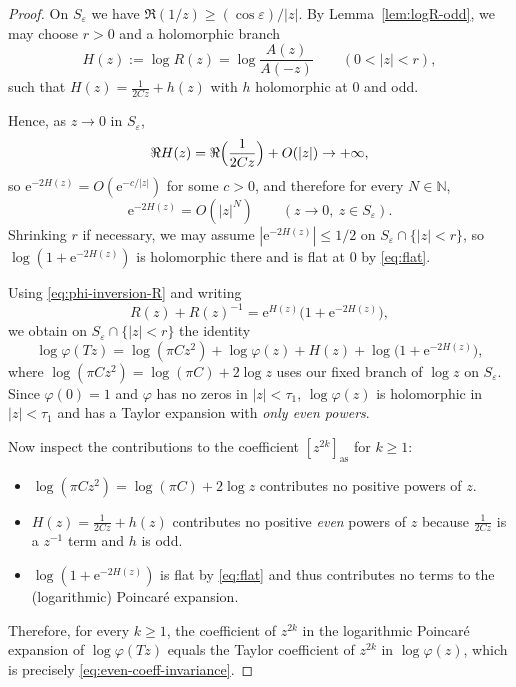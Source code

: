 \documentclass[11pt,letterpaper]{amsart}
\numberwithin{equation}{section}
\theoremstyle{definition}
\newcommand{\N}{\mathbb{N}}
\newcommand{\e}{\mathrm{e}}
\begin{document}
\begin{proof}
On $S_\varepsilon$ we have $\Re(1/z)\ge (\cos\varepsilon)/|z|$. By Lemma~\ref{lem:logR-odd},
we may choose $r>0$ and a holomorphic branch
\[
H(z):=\log R(z)=\log\frac{A(z)}{A(-z)}
\qquad (0<|z|<r),
\]
such that $H(z)=\frac{1}{2Cz}+h(z)$ with $h$ holomorphic at $0$ and odd.

Hence, as $z\to0$ in $S_\varepsilon$,
\[
\Re H(z)=\Re\Bigl(\frac{1}{2Cz}\Bigr)+O(|z|)\to +\infty,
\]
so $\e^{-2H(z)}=O(\e^{-c/|z|})$ for some $c>0$, and therefore for every $N\in\N$,
\begin{equation}\label{eq:flat}
\e^{-2H(z)}=O(|z|^N)\qquad (z\to0,\ z\in S_\varepsilon).
\end{equation}
Shrinking $r$ if necessary, we may assume $|\e^{-2H(z)}|\le 1/2$ on $S_\varepsilon\cap\{|z|<r\}$,
so $\log(1+\e^{-2H(z)})$ is holomorphic there and is flat at $0$ by \eqref{eq:flat}.

Using \eqref{eq:phi-inversion-R} and writing
\[
R(z)+R(z)^{-1}=\e^{H(z)}\bigl(1+\e^{-2H(z)}\bigr),
\]
we obtain on $S_\varepsilon\cap\{|z|<r\}$ the identity
\begin{equation}\label{eq:logphiT}
\log\varphi(Tz)
=
\log(\pi C z^2)+\log\varphi(z)+H(z)+\log\bigl(1+\e^{-2H(z)}\bigr),
\end{equation}
where $\log(\pi C z^2)=\log(\pi C)+2\log z$ uses our fixed branch of $\log z$ on $S_\varepsilon$.
Since $\varphi(0)=1$ and $\varphi$ has no zeros in $|z|<\tau_1$, $\log\varphi(z)$ is holomorphic in $|z|<\tau_1$
and has a Taylor expansion with \emph{only even powers}.

Now inspect the contributions to the coefficient $[z^{2k}]_{\mathrm{as}}$ for $k\ge1$:
\begin{itemize}[leftmargin=2.5em]
\item $\log(\pi C z^2)=\log(\pi C)+2\log z$ contributes no positive powers of $z$.
\item $H(z)=\frac{1}{2Cz}+h(z)$ contributes no positive \emph{even} powers of $z$ because
$\frac{1}{2Cz}$ is a $z^{-1}$ term and $h$ is odd.
\item $\log(1+\e^{-2H(z)})$ is flat by \eqref{eq:flat} and thus contributes no terms to the (logarithmic)
Poincar\'e expansion.
\end{itemize}
Therefore, for every $k\ge1$, the coefficient of $z^{2k}$ in the logarithmic Poincar\'e expansion of
$\log\varphi(Tz)$ equals the Taylor coefficient of $z^{2k}$ in $\log\varphi(z)$, which is precisely
\eqref{eq:even-coeff-invariance}.
\end{proof}
\end{document}

